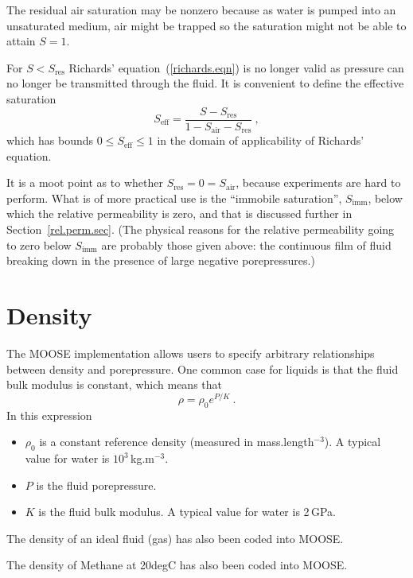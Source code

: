 \documentclass[]{scrreprt}
\begin{document}
The residual air saturation may be nonzero because as water is pumped
into an unsaturated medium, air might be trapped so the saturation
might not be able to attain $S=1$.

For $S<S_{\mathrm{res}}$ Richards' equation~(\ref{richards.eqn}) is no
longer valid as pressure can no longer be transmitted through the
fluid.  It is convenient to define the effective saturation
\begin{equation}
S_{\mathrm{eff}} = \frac{S - S_{\mathrm{res}}}{1 - S_{\mathrm{air}} -
  S_{\mathrm{res}}} \ ,
\end{equation}
which has bounds $0\leq S_{\mathrm{eff}} \leq 1$ in the domain of
applicability of Richards' equation.

It is a moot point as to whether
$S_{\mathrm{res}}=0=S_{\mathrm{air}}$, because experiments are hard to
perform.  What is of more practical use is the ``immobile
saturation'', $S_{\mathrm{imm}}$, below which the relative
permeability is zero, and that is discussed further in
Section~\ref{rel.perm.sec}.  (The physical reasons for the relative
permeability going to zero below $S_{\mathrm{imm}}$ are probably those
given above: the continuous film of fluid breaking down in the
presence of large negative porepressures.)


\section{Density}
\label{sec.density.constk}

The MOOSE implementation allows users to specify arbitrary
relationships between density and porepressure.  One common case
for liquids is that the fluid bulk modulus is constant, which means
that
\begin{equation}
\rho = \rho_{0}e^{P/K} \ .
\end{equation}
In this expression
\begin{itemize}
\item $\rho_{0}$ is a constant reference density (measured in
  mass.length$^{-3}$).  A typical value for water is
  $10^{3}$\,kg.m$^{-3}$.
\item $P$ is the fluid porepressure.
\item $K$ is the fluid bulk modulus.  A typical value for water is
  2\,GPa.
\end{itemize}

The density of an ideal fluid (gas) has also been coded into MOOSE.

The density of Methane at 20degC has also been coded into MOOSE.
\end{document}
